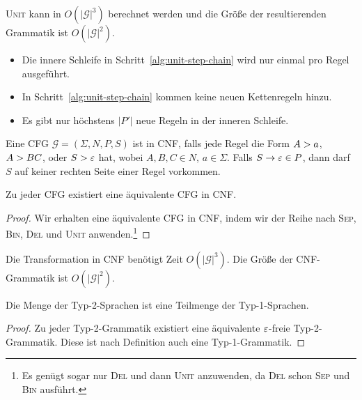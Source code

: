 \begin{Bemerkung}
\textsc{Unit} kann in $O(|\mathcal{G}|^3)$ berechnet werden und die Größe der resultierenden Grammatik ist $O(|\mathcal{G}|^2)$.
\begin{itemize}
	\item Die innere Schleife in Schritt~\ref{alg:unit-step-chain} wird nur einmal pro Regel ausgeführt.
	
	\item In Schritt~\ref{alg:unit-step-chain} kommen keine neuen Kettenregeln hinzu.
	
	\item Es gibt nur höchstens $|P'|$ neue Regeln in der inneren Schleife.
	\qedhere
\end{itemize}
\end{Bemerkung}




\begin{Def}[name={[\acs*{CFG} in \acs*{CNF}]}]
	Eine \ac{CFG} $\mathcal{G} = (\Sigma, N, P, S)$ ist in \ac{CNF}, falls jede
  Regel die Form $A\->a$, $A\->BC$, oder $S \-> \varepsilon$ hat, wobei $A,B,C\in N$, $a\in\Sigma$.
  Falls $S \to \varepsilon \in P$, dann darf $S$ auf keiner rechten Seite einer Regel vorkommen.
\end{Def}
\begin{Satz}
Zu jeder \ac{CFG} existiert eine äquivalente \ac{CFG} in \ac{CNF}.
\end{Satz}

\begin{proof}
    Wir erhalten eine äquivalente \ac{CFG} in \ac{CNF}, indem wir 
    der Reihe nach \textsc{Sep}, \textsc{Bin}, \textsc{Del} und \textsc{Unit} anwenden.\footnote{Es genügt sogar nur \textsc{Del} und dann \textsc{Unit} anzuwenden, da \textsc{Del} schon \textsc{Sep} und \textsc{Bin} ausführt.}
\end{proof}
	
\begin{Bemerkung} 
Die Transformation in \ac{CNF} benötigt Zeit $O(|\mathcal{G}|^3)$. Die Größe der \ac{CNF}-Grammatik ist $O(|\mathcal{G}|^2)$.
\end{Bemerkung}

\begin{lemma}
 Die Menge der Typ-2-Sprachen ist eine Teilmenge der Typ-1-Sprachen.
\end{lemma}
\begin{proof}
 Zu jeder Typ-2-Grammatik existiert eine äquivalente $\varepsilon$-freie Typ-2-Grammatik.
 Diese ist nach Definition auch eine Typ-1-Grammatik.
\end{proof}



